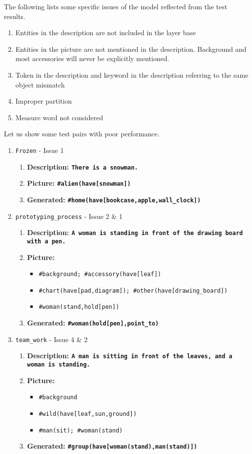\documentclass{article} %
\begin{document}
The following lists some specific issues of the model reflected from the test results. 
\begin{enumerate}
	\item Entities in the description are not included in the layer base
	\item Entities in the picture are not mentioned in the description. Background and most accessories will never be explicitly mentioned. 
	\item Token in the description and keyword in the description referring to the same object mismatch
	\item Improper partition
	\item Measure word not considered
\end{enumerate}

Let us show some test pairs with poor performance.
\begin{enumerate}
	
	\item \verb|Frozen| - Issue 1
	\begin{enumerate}
		\item \bf{Description}: \verb|There is a snowman.|
		\item \bf{Picture}: \verb|#alien(have[snowman])|
		\item \bf{Generated}: \verb|#home(have[bookcase,apple,wall_clock])|
	\end{enumerate}
	
	\item \verb|prototyping_process| - Issue 2 \& 1
	\begin{enumerate}
		\item \bf{Description}: \verb|A woman is standing in front of the drawing board with a pen.|
		\item \bf{Picture}: 
		\begin{itemize}
			\item \verb|#background; #accessory(have[leaf])|
			\item \verb|#chart(have[pad,diagram]); #other(have[drawing_board])|
			\item \verb|#woman(stand,hold[pen])|
		\end{itemize}
		\item \bf{Generated}: \verb|#woman(hold[pen],point_to)|
	\end{enumerate}

	\item \verb|team_work| - Issue 4 \& 2
	\begin{enumerate}
		\item \bf{Description}: \verb|A man is sitting in front of the leaves, and a woman is standing.|
		\item \bf{Picture}: 
		\begin{itemize}
			\item \verb|#background|
			\item \verb|#wild(have[leaf,sun,ground])|
			\item \verb|#man(sit); #woman(stand)|
		\end{itemize}
		\item \bf{Generated}: \verb|#group(have[woman(stand),man(stand)])|
	\end{enumerate}


\end{enumerate}
\end{document}
